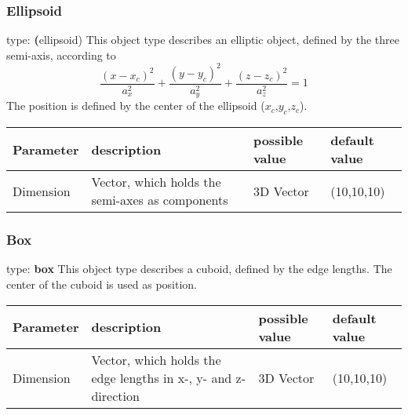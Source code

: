 \documentclass[a4paper,html,11pt,openany]{book}
\begin{document}
 \subsubsection{Ellipsoid}
 type: \textbf (ellipsoid)
 This object type describes an elliptic object, defined by the three semi-axis, according to
  \begin{equation}
  \frac{(x-x_c)^2}{a_x^2}+\frac{(y-y_c)^2}{a_y^2}+\frac{(z-z_c)^2}{a_z^2}=1
\end{equation}   
The position is defined by the center of the ellipsoid ($x_c$,$y_c$,$z_c$).

\vspace{1em}
\begin{tabular}{p{2cm}|p{4cm}|p{4cm}|p{1cm}}
 Parameter  & description  & possible value & default value\\
 \hline
 Dimension & Vector, which holds the semi-axes as components & 3D Vector & (10,10,10) 
 \end{tabular}
 \subsubsection{Box}
 type: \textbf{box}
 This object type describes a cuboid, defined by the edge lengths. The center of the cuboid is used as position.
 
\vspace{1em}
\begin{tabular}{p{2cm}|p{4cm}|p{4cm}|p{1cm}}
 Parameter  & description  & possible value & default value\\
 \hline
 Dimension & Vector, which holds the edge lengths in x-, y- and z-direction & 3D Vector & (10,10,10) 
 \end{tabular}
\end{document}

